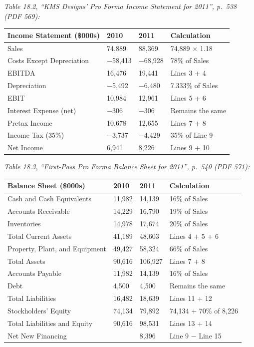 \documentclass[11pt,a4paper]{article}
\begin{document}
\emph{Table 18.2, ``KMS Designs' Pro Forma Income Statement for 2011'', p.~538 (PDF 569):}

{\def\LTcaptype{none} %
\begin{longtable}[]{@{}llll@{}}
\toprule\noalign{}
Income Statement (\$000s) & 2010 & 2011 & Calculation \\
\midrule\noalign{}
\endhead
\bottomrule\noalign{}
\endlastfoot
Sales & 74,889 & 88,369 & 74,889 × 1.18 \\
Costs Except Depreciation & −58,413 & −68,928 & 78\% of Sales \\
EBITDA & 16,476 & 19,441 & Lines 3 + 4 \\
Depreciation & −5,492 & −6,480 & 7.333\% of Sales \\
EBIT & 10,984 & 12,961 & Lines 5 + 6 \\
Interest Expense (net) & −306 & −306 & Remains the same \\
Pretax Income & 10,678 & 12,655 & Lines 7 + 8 \\
Income Tax (35\%) & −3,737 & −4,429 & 35\% of Line 9 \\
Net Income & 6,941 & 8,226 & Lines 9 + 10 \\
\end{longtable}
}

\emph{Table 18.3, ``First-Pass Pro Forma Balance Sheet for 2011'', p.~540 (PDF 571):}

{\def\LTcaptype{none} %
\begin{longtable}[]{@{}llll@{}}
\toprule\noalign{}
Balance Sheet (\$000s) & 2010 & 2011 & Calculation \\
\midrule\noalign{}
\endhead
\bottomrule\noalign{}
\endlastfoot
Cash and Cash Equivalents & 11,982 & 14,139 & 16\% of Sales \\
Accounts Receivable & 14,229 & 16,790 & 19\% of Sales \\
Inventories & 14,978 & 17,674 & 20\% of Sales \\
Total Current Assets & 41,189 & 48,603 & Lines 4 + 5 + 6 \\
Property, Plant, and Equipment & 49,427 & 58,324 & 66\% of Sales \\
Total Assets & 90,616 & 106,927 & Lines 7 + 8 \\
Accounts Payable & 11,982 & 14,139 & 16\% of Sales \\
Debt & 4,500 & 4,500 & Remains the same \\
Total Liabilities & 16,482 & 18,639 & Lines 11 + 12 \\
Stockholders' Equity & 74,134 & 79,892 & 74,134 + 70\% of 8,226 \\
Total Liabilities and Equity & 90,616 & 98,531 & Lines 13 + 14 \\
Net New Financing & & 8,396 & Line 9 − Line 15 \\
\end{longtable}
}
\end{document}
